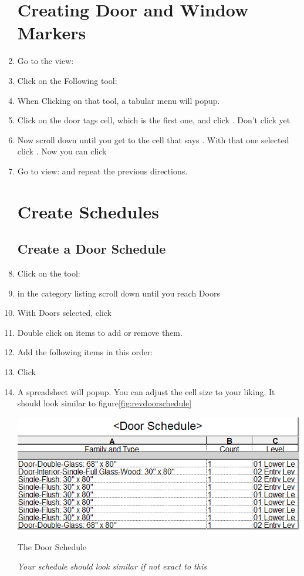 \documentclass{tufte-book} %
\begin{document}
\begin{enumerate}
\section{Creating Door and Window Markers}
	\item Go to the view: 
	\item Click on the Following tool: 
	\item When Clicking on that tool, a tabular menu will popup.
	\item Click on the door tags cell, which is the first one, and click . Don't click  yet
	\item Now scroll down until you get to the cell that says . With that one selected click . Now you can click 
	\item Go to view:  and repeat the previous directions.
\section{Create Schedules}
	\subsection{Create a Door Schedule}
		\item Click on the tool: 
		\item in the category listing scroll down until you reach Doors
		\item With Doors selected, click 
		\item Double click on items to add or remove them.
		\item Add the following items in this order: 
		\item Click 
		\item A spreadsheet will popup. You can adjust the cell size to your liking. It should look similar to figure\ref{fig:revdoorschedule}
		
		\begin{marginfigure}
			\includegraphics[width=\linewidth]{revitdoorschedule.png}
			\caption{The Door Schedule}
			\emph{Your schedule should look similar if not exact to this}
			\label{fig:revdoorschedule}
		\end{marginfigure}
		

\end{enumerate}
\end{document}
